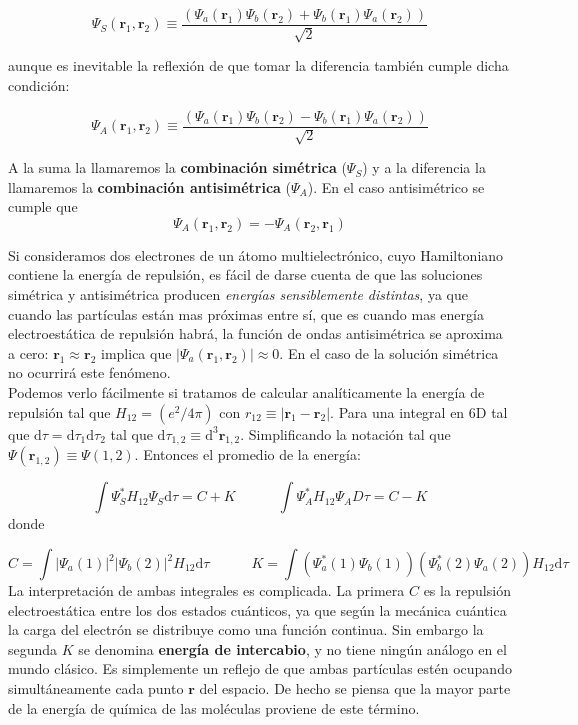 \documentclass[12pt,a4paper]{article}
\numberwithin{equation}{section}
\numberwithin{figure}{section}
\newcommand{\D}{\mathrm{d}}
\newcommand{\tquad}{\quad \quad \quad}
\newcommand{\rn}{\mathbf{r}}
\begin{document}
\begin{equation}
\Psi_S (\rn_1 , \rn_2) \equiv \dfrac{(\Psi_a (\rn_1) \Psi_b (\rn_2)+\Psi_b (\rn_1) \Psi_a (\rn_2))}{\sqrt{2}}
\end{equation}

aunque es inevitable la reflexión de que tomar la diferencia también cumple dicha condición:

\begin{equation}
\Psi_A (\rn_1 , \rn_2) \equiv \dfrac{(\Psi_a (\rn_1) \Psi_b (\rn_2)-\Psi_b (\rn_1) \Psi_a (\rn_2))}{\sqrt{2}}
\end{equation}

A la suma la llamaremos la \textbf{combinación simétrica} ($\Psi_S$) y a la diferencia la llamaremos la  \textbf{combinación antisimétrica} ($\Psi_A$). En el caso antisimétrico se cumple que  
\begin{equation}
\Psi_A (\rn_1,\rn_2)  = - \Psi_A (\rn_2,\rn_1) 
\end{equation} 

Si consideramos dos electrones de un átomo multielectrónico, cuyo Hamiltoniano contiene la energía de repulsión, es fácil de darse cuenta de que las soluciones simétrica y antisimétrica producen \textit{energías sensiblemente distintas}, ya que cuando las partículas están mas próximas entre sí, que es cuando mas energía electroestática de repulsión habrá, la función de ondas antisimétrica se aproxima a cero: $\rn_1 \approx \rn_2$ implica que $| \Psi_a (\rn_1,\rn_2) | \approx 0$. En el caso de la solución simétrica no ocurrirá este fenómeno. \\

Podemos verlo fácilmente si tratamos de calcular analíticamente la energía de repulsión tal que $H_{12} = (e^2 / 4 \pi)$ con $r_{12} \equiv | \rn_1 - \rn_2 |$. Para una integral en 6D tal que $\D \tau = \D \tau_1 \D \tau_2$ tal que $\D \tau_{1,2} \equiv \D^3 \rn_{1,2}$. Simplificando la notación tal que $\Psi (\rn_{1,2}) \equiv \Psi (1,2)$. Entonces el promedio de la energía:

\begin{equation}
\int \Psi_S^* H_{12} \Psi_S  \D \tau = C+K \tquad \int \Psi_A^* H_{12} \Psi_A D \tau = C-K
\end{equation}
donde

\begin{equation}
C = \int |\Psi_a (1)|^2 |\Psi_b (2)|^2 H_{12} \D \tau \tquad 
K = \int (\Psi^*_a (1) \Psi_b(1)) (\Psi^*_b (2) \Psi_a (2)) H_{12} \D \tau  
\end{equation}
La interpretación de ambas integrales es complicada. La primera $C$ es la repulsión electroestática entre los dos estados cuánticos, ya que según la mecánica cuántica la carga del electrón se distribuye como una función continua. Sin embargo la segunda $K$ se denomina \textbf{energía de intercabio}, y no tiene ningún análogo en el mundo clásico. Es simplemente un reflejo de que ambas partículas estén ocupando simultáneamente cada punto $\rn$ del espacio. De hecho se piensa que la mayor parte de la energía de química de las moléculas proviene de este término. \\
 
\end{document}
